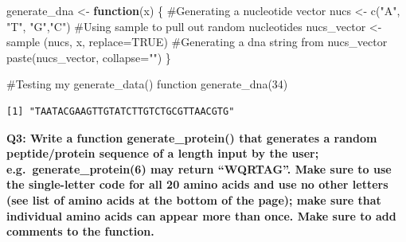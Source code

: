 \documentclass[
  letterpaper,
  DIV=11,
  numbers=noendperiod]{scrartcl}
\newenvironment{Shaded}{\begin{snugshade}}{\end{snugshade}}
\newcommand{\AttributeTok}[1]{\textcolor[rgb]{0.40,0.45,0.13}{#1}}
\newcommand{\CommentTok}[1]{\textcolor[rgb]{0.37,0.37,0.37}{#1}}
\newcommand{\ConstantTok}[1]{\textcolor[rgb]{0.56,0.35,0.01}{#1}}
\newcommand{\ControlFlowTok}[1]{\textcolor[rgb]{0.00,0.23,0.31}{\textbf{#1}}}
\newcommand{\DecValTok}[1]{\textcolor[rgb]{0.68,0.00,0.00}{#1}}
\newcommand{\FunctionTok}[1]{\textcolor[rgb]{0.28,0.35,0.67}{#1}}
\newcommand{\NormalTok}[1]{\textcolor[rgb]{0.00,0.23,0.31}{#1}}
\newcommand{\OtherTok}[1]{\textcolor[rgb]{0.00,0.23,0.31}{#1}}
\newcommand{\StringTok}[1]{\textcolor[rgb]{0.13,0.47,0.30}{#1}}
\begin{document}
\begin{Shaded}
\begin{Highlighting}[]
\NormalTok{generate\_dna }\OtherTok{\textless{}{-}} \ControlFlowTok{function}\NormalTok{(x) \{}
  \CommentTok{\#Generating a nucleotide vector }
\NormalTok{  nucs }\OtherTok{\textless{}{-}} \FunctionTok{c}\NormalTok{(}\StringTok{"A"}\NormalTok{, }\StringTok{"T"}\NormalTok{, }\StringTok{"G"}\NormalTok{,}\StringTok{"C"}\NormalTok{)}
  \CommentTok{\#Using sample to pull out random nucleotides}
\NormalTok{  nucs\_vector }\OtherTok{\textless{}{-}} \FunctionTok{sample}\NormalTok{ (nucs, x, }\AttributeTok{replace=}\ConstantTok{TRUE}\NormalTok{)}
  \CommentTok{\#Generating a dna string from nucs\_vector}
  \FunctionTok{paste}\NormalTok{(nucs\_vector, }\AttributeTok{collapse=}\StringTok{""}\NormalTok{)}
\NormalTok{\}}

\CommentTok{\#Testing my generate\_data() function }
\FunctionTok{generate\_dna}\NormalTok{(}\DecValTok{34}\NormalTok{)}
\end{Highlighting}
\end{Shaded}

\begin{verbatim}
[1] "TAATACGAAGTTGTATCTTGTCTGCGTTAACGTG"
\end{verbatim}

\textbf{Q3: Write a function generate\_protein() that generates a random
peptide/protein sequence of a length input by the user;
e.g.~generate\_protein(6) may return ``WQRTAG''. Make sure to use the
single-letter code for all 20 amino acids and use no other letters (see
list of amino acids at the bottom of the page); make sure that
individual amino acids can appear more than once. Make sure to add
comments to the function.}
\end{document}
